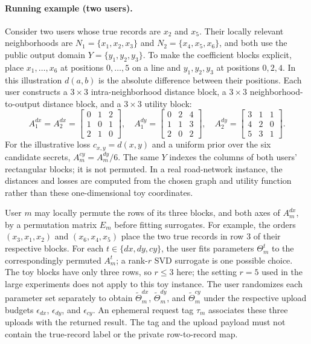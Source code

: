 \paragraph{Running example (two users).}
Consider two users whose true records are $x_2$ and $x_5$. Their locally
relevant neighborhoods are $N_1=\{x_1,x_2,x_3\}$ and
$N_2=\{x_4,x_5,x_6\}$, and both use the public output domain
$Y=\{y_1,y_2,y_3\}$. To make the coefficient blocks explicit, place
$x_1,\ldots,x_6$ at positions $0,\ldots,5$ on a line and
$y_1,y_2,y_3$ at positions $0,2,4$. In this illustration
$d(a,b)$ is the absolute difference between their positions.
Each user constructs a $3\times3$ intra-neighborhood distance block,
a $3\times3$ neighborhood-to-output distance block, and a
$3\times3$ utility block:
\[
 A^{dx}_1=A^{dx}_2=
 \begin{bmatrix}0&1&2\\1&0&1\\2&1&0\end{bmatrix},\quad
 A^{dy}_1=\begin{bmatrix}0&2&4\\1&1&3\\2&0&2\end{bmatrix},\quad
 A^{dy}_2=\begin{bmatrix}3&1&1\\4&2&0\\5&3&1\end{bmatrix}.
\]
For the illustrative loss $c_{x,y}=d(x,y)$ and a uniform prior over
the six candidate secrets, $A^{cy}_m=A^{dy}_m/6$. The same $Y$
indexes the columns of both users' rectangular blocks; it is not
permuted. In a real road-network instance, the distances and losses
are computed from the chosen graph and utility function rather than
these one-dimensional toy coordinates.

User $m$ may locally permute the rows of its three blocks, and both
axes of $A^{dx}_m$, by a permutation matrix $E_m$ before fitting
surrogates. For example, the orders $(x_3,x_1,x_2)$ and
$(x_6,x_4,x_5)$ place the two true records in row 3 of their
respective blocks. For each $t\in\{dx,dy,cy\}$, the user fits
parameters $\Theta_m^t$ to the correspondingly permuted $A_m^t$;
a rank-$r$ SVD surrogate is one possible choice. The toy blocks
have only three rows, so $r\leq3$ here; the setting $r=5$ used in
the large experiments does not apply to this toy instance. The
user randomizes each parameter set separately to obtain
$\widetilde\Theta_m^{dx}$, $\widetilde\Theta_m^{dy}$, and
$\widetilde\Theta_m^{cy}$ under the respective upload budgets
$\epsilon_{dx}$, $\epsilon_{dy}$, and $\epsilon_{cy}$. An
ephemeral request tag $\tau_m$ associates these three uploads with
the returned result. The tag and the upload payload must not contain
the true-record label or the private row-to-record map.

